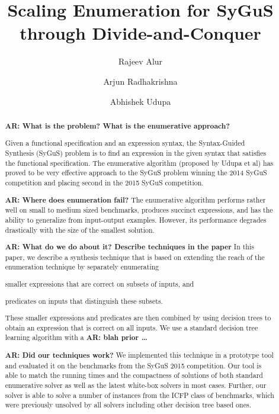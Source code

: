 \documentclass{llncs}
\newcommand\arsays[1]{{\bf AR: #1}}
\begin{document}
\title{Scaling Enumeration for SyGuS through Divide-and-Conquer}
\author{Rajeev Alur \and Arjun Radhakrishna \and Abhishek Udupa}
\maketitle

\begin{abstract}
  \arsays{What is the problem? What is the enumerative approach?}

  Given a functional specification and an expression syntax, the
  Syntax-Guided Synthesis (SyGuS) problem is to find an expression in
  the given syntax that satisfies the functional specification.
  The enumerative algorithm (proposed by Udupa et al) has proved to be
  very effective approach to the SyGuS problem winning the 2014 SyGuS
  competition and placing second in the 2015 SyGuS competition.

  \arsays{Where does enumeration fail?}
  The enumerative algorithm performs rather well on small to
  medium sized benchmarks, produces succinct expressions, and has the
  ability to generalize from input-output examples.
  However, its performance degrades drastically with the size of the
  smallest solution. 

  \arsays{What do we do about it? Describe techniques in the paper}
  In this paper, we describe a synthesis technique that is based on
  extending the reach of the enumeration technique by separately
  enumerating
  \begin{inparaenum}[(a)]
  \item smaller expressions that are correct on subsets of inputs, and
  \item predicates on inputs that distinguish these subsets.
  \end{inparaenum}
  These smaller expressions and predicates are then combined by using
  decision trees to obtain an expression that is correct on all inputs.
  We use a standard decision tree learning algorithm with a \arsays{blah
  prior \dots }

  \arsays{Did our techniques work?}
  We implemented this technique in a prototype tool and evaluated it on
  the benchmarks from the SyGuS 2015 competition.
  Our tool is able to match the running times and the compactness of
  solutions of both standard enumerative solver as well as the latest
  white-box solvers in most cases.
  Further, our solver is able to solve a number of instances from the
  ICFP class of benchmarks, which were previously unsolved by all
  solvers including other decision tree based ones. 
\end{abstract}
\end{document}
